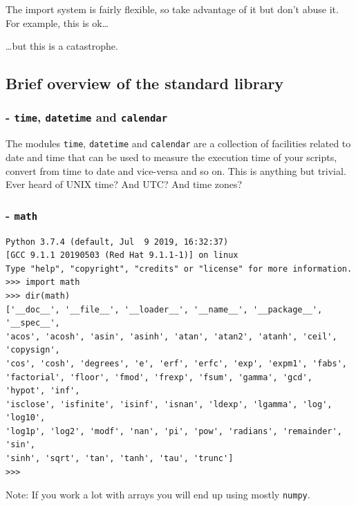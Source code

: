 The import system is fairly flexible, so take advantage of it but don't abuse it. For example, this is ok\ldots

\medskip


\ldots but this is a catastrophe.

\medskip


\subsection{Brief overview of the standard library}
\subsubsection{- \texttt{time}, \texttt{datetime} and \texttt{calendar}}

The modules \texttt{time}, \texttt{datetime} and \texttt{calendar} are a collection of facilities related to date and time that can be used to measure the execution time of your scripts, convert from time to date and vice-versa and so on. This is anything but trivial. Ever heard of UNIX time? And UTC? And time zones?

\subsubsection{- \texttt{math}}
\begin{verbatim}
Python 3.7.4 (default, Jul  9 2019, 16:32:37)
[GCC 9.1.1 20190503 (Red Hat 9.1.1-1)] on linux
Type "help", "copyright", "credits" or "license" for more information.
>>> import math
>>> dir(math)
['__doc__', '__file__', '__loader__', '__name__', '__package__', '__spec__',
'acos', 'acosh', 'asin', 'asinh', 'atan', 'atan2', 'atanh', 'ceil', 'copysign',
'cos', 'cosh', 'degrees', 'e', 'erf', 'erfc', 'exp', 'expm1', 'fabs',
'factorial', 'floor', 'fmod', 'frexp', 'fsum', 'gamma', 'gcd', 'hypot', 'inf',
'isclose', 'isfinite', 'isinf', 'isnan', 'ldexp', 'lgamma', 'log', 'log10',
'log1p', 'log2', 'modf', 'nan', 'pi', 'pow', 'radians', 'remainder', 'sin',
'sinh', 'sqrt', 'tan', 'tanh', 'tau', 'trunc']
>>>
\end{verbatim}

\medskip

Note: If you work a lot with arrays you will end up using mostly \texttt{numpy}.

